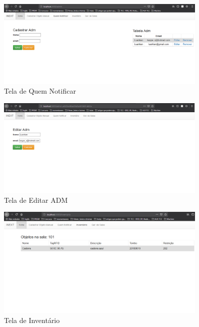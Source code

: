      \begin{figure}[H]
              \caption{\label{fig:tela_cadastro_manual}Tela de Quem Notificar}
              \centering
              \includegraphics[width=0.9\textwidth]{Figuras/tela_quem_notificar.PNG}
    \end{figure}
    
    \begin{figure}[H]
              \caption{\label{fig:tela_cadastro_manual}Tela de Editar ADM}
              \centering
              \includegraphics[width=0.9\textwidth]{Figuras/tela_editar_adm.png}
    \end{figure}
    
    \begin{figure}[H]
              \caption{\label{fig:tela_inventario}Tela de Inventário}
              \centering
              \includegraphics[width=0.9\textwidth]{Figuras/tela_inventario.png}
    \end{figure}
    
